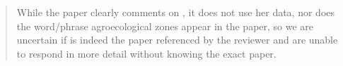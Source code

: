 \documentclass{article}[11pt]
\begin{document}
\begin{enumerate}
\begin{itemize}
\begin{quote}
        While the paper clearly comments on \citet{S2011}, it does not use her data, nor does the word/phrase agroecological zones appear in the paper, so we are uncertain if \citet{A2011} is indeed the paper referenced by the reviewer and are unable to respond in more detail without knowing the exact paper.
    \end{quote}
  \end{itemize}

\end{enumerate}



\newpage 



\newpage
\begin{landscape}
    {\centering
    
    }
\end{landscape}
{\centering
}
\end{document}
